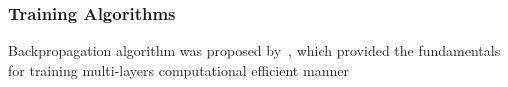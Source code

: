 \subsubsection{Training Algorithms}
Backpropagation algorithm was proposed by~\citet{werbos1975beyond}, which provided the fundamentals for training multi-layers computational efficient manner